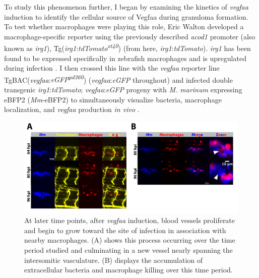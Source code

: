 To study this phenomenon further, I began by examining the kinetics of \textit{vegfaa} induction to identify the cellular source of Vegfaa during granuloma formation. To test whether macrophages were playing this role, Eric Walton developed a macrophage\hyp{}specific reporter using the previously described \textit{acod1} promoter (also known as \textit{irg1}), Tg(\textit{irg1}:\textit{tdTomato\textsuperscript{xt40}}) (from here, \textit{irg1}:\textit{tdTomato}). \textit{irg1} has been found to be expressed specifically in zebrafish macrophages and is upregulated during infection \citep{Sanderson2015, Kwon2022}. I then crossed this line with the \textit{vegfaa} reporter line TgBAC(\textit{vegfaa}:\textit{eGFP\textsuperscript{pd260}}) (\textit{vegfaa}:\textit{eGFP} throughout) \citep{Karra2018} and infected double transgenic \textit{irg1}:\textit{tdTomato}; \textit{vegfaa}:\textit{eGFP} progeny with \textit{M. marinum} expressing eBFP2 (\textit{Mm}\hyp{}eBFP2) to simultaneously visualize bacteria, macrophage localization, and \textit{vegfaa} production \textit{in vivo} \citep{Takaki2013}.

\begin{figure}
\centering
\includegraphics[width=\textwidth]{images/extracellularflk1.pdf}
\caption[Extracellular bacterial growth correlates with angiogenesis]{At later time points, after \textit{vegfaa} induction, blood vessels proliferate and begin to grow toward the site of infection in association with nearby macrophages. (A) shows this process occurring over the time period studied and culminating in a new vessel nearly spanning the intersomitic vasculature. (B) displays the accumulation of extracellular bacteria and macrophage killing over this time period.}
\label{figure:ecflk1}

\end{figure}

